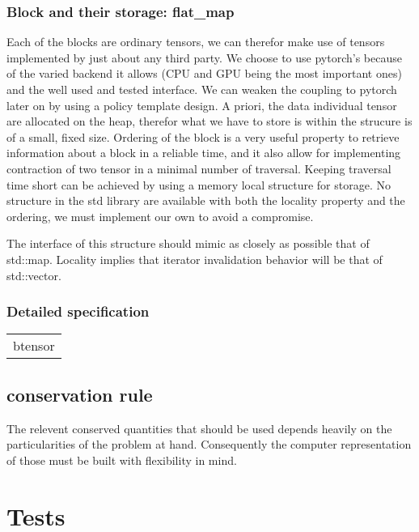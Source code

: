 \documentclass[15pt]{book}
\begin{document}
\FloatBarrier
\subsection{Block and their storage: flat_map}
Each of the blocks are ordinary tensors, we can therefor make use of tensors implemented by just about any third party. We choose to use pytorch's because of the varied backend it allows (CPU and GPU being the most important ones) and the well used and tested interface. We can weaken the coupling to pytorch later on by using a policy template design.
A priori, the data individual tensor are allocated on the heap, therefor what we have to store is within the strucure is of a small, fixed size. Ordering of the block is a very useful property to retrieve information about a block in a reliable time, and it also allow for implementing contraction of two tensor in a minimal number of traversal.
Keeping traversal time short can be achieved by using a memory local structure for storage.
No structure in the std library are available with both the locality property and the ordering, we must implement our own to avoid a compromise. 

The interface of this structure should mimic as closely as possible that of std::map. Locality implies that iterator invalidation behavior will be that of std::vector.

\subsection{Detailed specification}
\begin{table}
    \begin{tabular}{|l|}
        \hline
        \multicolumn{1}{|c|}{btensor}\\
        
        
    \end{tabular}
\end{table}

\section{conservation rule}
The relevent conserved quantities that should be used depends heavily on the particularities of the problem at hand.
Consequently the computer representation of those must be built with flexibility in mind.

\chapter{Tests}
\end{document}
